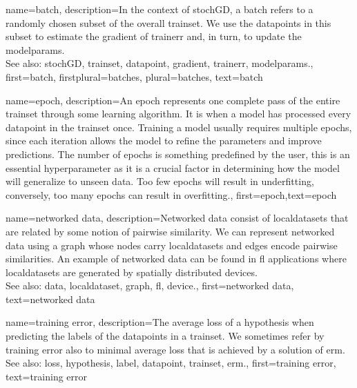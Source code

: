 {name={batch},
	description={In the context of \gls{stochGD}, a batch refers to a randomly 
		chosen subset of the overall \gls{trainset}. We use the \glspl{datapoint} in this subset 
		to estimate the \gls{gradient} of \gls{trainerr} and, in turn, to update the \gls{modelparams}.
			\\
		See also: \gls{stochGD}, \gls{trainset}, \gls{datapoint}, \gls{gradient}, \gls{trainerr}, \gls{modelparams}.}, 
 	first={batch},
 	firstplural={batches}, 
 	plural={batches}, 
 	text={batch}  
}


{name={epoch},
	description={An epoch represents one complete pass of the entire \gls{trainset} through some learning \gls{algorithm}. It is when a \gls{model} has processed every \gls{datapoint} in the \gls{trainset} once. 
	Training a \gls{model} usually requires multiple epochs, since each iteration allows the \gls{model} to refine the \gls{parameter}s and improve \gls{prediction}s. The number of epochs is something predefined by the user, 
	this is an essential hyperparameter as it is a crucial factor in determining how the model will generalize to unseen data. Too few epochs will result in \gls{underfitting}, conversely, too many epochs can result in \gls{overfitting}.},
	first={epoch},text={epoch}
} 


{name={networked data},
	description={Networked \gls{data} consist of \glspl{localdataset} 
		that are related by some notion of pairwise similarity. We can represent networked 
		\gls{data} using a \gls{graph} whose nodes carry \glspl{localdataset} and edges encode 
		pairwise similarities. An example of networked \gls{data} can be found in \gls{fl} applications 
		where \glspl{localdataset} are generated by spatially distributed \glspl{device}.
			\\
		See also: \gls{data}, \gls{localdataset}, \gls{graph}, \gls{fl}, \gls{device}.}, 
	first={networked data},
	text={networked data}  
}

{name={training error},
	description={The average \gls{loss} of a \gls{hypothesis} when 
		predicting the \glspl{label} of the \glspl{datapoint} in a \gls{trainset}. 
		We sometimes refer by training error also to minimal average \gls{loss} 
		that is achieved by a solution of \gls{erm}.
				\\
		See also: \gls{loss}, \gls{hypothesis}, \gls{label}, \gls{datapoint}, \gls{trainset}, \gls{erm}.},
	first={training error},
	text={training error}  
}


